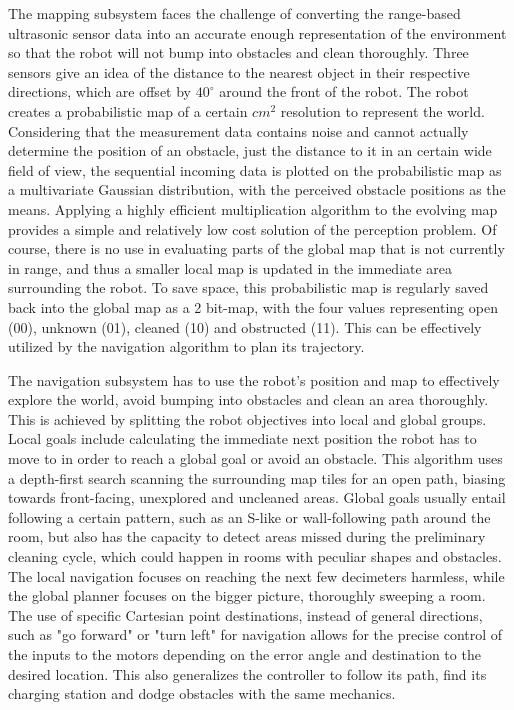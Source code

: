 The mapping subsystem faces the challenge of converting the range-based ultrasonic sensor data into an accurate enough representation of the environment so that the robot will not bump into obstacles and clean thoroughly. Three sensors give an idea of the distance to the nearest object in their respective directions, which are offset by $40^\circ$ around the front of the robot. The robot creates a probabilistic map of a certain $cm^2$ resolution to represent the world. Considering that the measurement data contains noise and cannot actually determine the position of an obstacle, just the distance to it in an certain wide field of view, the sequential incoming data is plotted on the probabilistic map as a multivariate Gaussian distribution, with the perceived obstacle positions as the means. Applying a highly efficient multiplication algorithm to the evolving map provides a simple and relatively low cost solution of the perception problem. Of course, there is no use in evaluating parts of the global map that is not currently in range, and thus a smaller local map is updated in the immediate area surrounding the robot. To save space, this probabilistic map is regularly saved back into the global map as a 2 bit-map, with the four values representing open (00), unknown (01), cleaned (10) and obstructed (11). This can be effectively utilized by the navigation algorithm to plan its trajectory.

The navigation subsystem has to use the robot's position and map to effectively explore the world, avoid bumping into obstacles and clean an area thoroughly. This is achieved by splitting the robot objectives into local and global groups. Local goals include calculating the immediate next position the robot has to move to in order to reach a global goal or avoid an obstacle. This algorithm uses a depth-first search scanning the surrounding map tiles for an open path, biasing towards front-facing, unexplored and uncleaned areas. Global goals usually entail following a certain pattern, such as an S-like or wall-following path around the room, but also has the capacity to detect areas missed during the preliminary cleaning cycle, which could happen in rooms with peculiar shapes and obstacles. The local navigation focuses on reaching the next few decimeters harmless, while the global planner focuses on the bigger picture, thoroughly sweeping a room. The use of specific Cartesian point destinations, instead of general directions, such as "go forward" or "turn left" for navigation allows for the precise control of the inputs to the motors depending on the error angle and destination to the desired location. This also generalizes the controller to follow its path, find its charging station and dodge obstacles with the same mechanics. \\



\newpage


